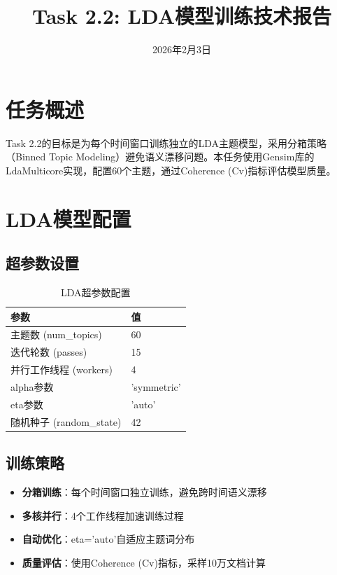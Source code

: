 \documentclass[11pt,a4paper]{article}
\title{\textbf{Task 2.2: LDA模型训练技术报告}}
\date{2026年2月3日}
\begin{document}
\maketitle

\section{任务概述}

Task 2.2的目标是为每个时间窗口训练独立的LDA主题模型，采用分箱策略（Binned Topic Modeling）避免语义漂移问题。本任务使用Gensim库的LdaMulticore实现，配置60个主题，通过Coherence (Cv)指标评估模型质量。

\section{LDA模型配置}

\subsection{超参数设置}

\begin{table}[h]
\centering
\begin{tabular}{ll}
\toprule
\textbf{参数} & \textbf{值} \\
\midrule
主题数 (num\_topics) & 60 \\
迭代轮数 (passes) & 15 \\
并行工作线程 (workers) & 4 \\
alpha参数 & 'symmetric' \\
eta参数 & 'auto' \\
随机种子 (random\_state) & 42 \\
\bottomrule
\end{tabular}
\caption{LDA超参数配置}
\end{table}

\subsection{训练策略}

\begin{itemize}
    \item \textbf{分箱训练}：每个时间窗口独立训练，避免跨时间语义漂移
    \item \textbf{多核并行}：4个工作线程加速训练过程
    \item \textbf{自动优化}：eta='auto'自适应主题词分布
    \item \textbf{质量评估}：使用Coherence (Cv)指标，采样10万文档计算
\end{itemize}
\end{document}

